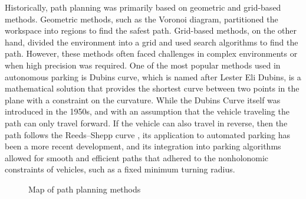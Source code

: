 Historically, path planning was primarily based on geometric and grid-based methods. Geometric methods, such as the Voronoi diagram, partitioned the workspace into regions to find the safest path. Grid-based methods, on the other hand, divided the environment into a grid and used search algorithms to find the path. However, these methods often faced challenges in complex environments or when high precision was required. One of the most popular methods used in autonomous parking is Dubins curve, which is named after Lester Eli Dubins, is a mathematical solution that provides the shortest curve between two points in the plane with a constraint on the curvature. While the Dubins Curve itself was introduced in the 1950s, and with an assumption that the vehicle traveling the path can only travel forward. If the vehicle can also travel in reverse, then the path follows the Reeds–Shepp curve \parencite{reeds1990optimal}, its application to automated parking has been a more recent development, and its integration into parking algorithms allowed for smooth and efficient paths that adhered to the nonholonomic constraints of vehicles, such as a fixed minimum turning radius.

\begin{figure}[h]
\centering
{}
\caption{Map of path planning methods}
\label{fig: path planning map}
\end{figure}

